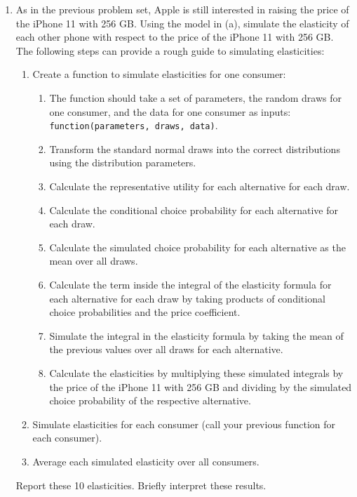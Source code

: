 \documentclass[11pt,letterpaper]{article}\usepackage[]{graphicx}\usepackage[]{color}
\begin{document}
\begin{enumerate}[label=\alph*., leftmargin=*]
	\item As in the previous problem set, Apple is still interested in raising the price of the iPhone 11 with 256 GB. Using the model in (a), simulate the elasticity of each other phone with respect to the price of the iPhone 11 with 256 GB. The following steps can provide a rough guide to simulating elasticities:
	\begin{enumerate}[label=\Roman*.]
		\item Create a function to simulate elasticities for one consumer:
		\begin{enumerate}[label=\roman*.]
			\item The function should take a set of parameters, the random draws for one consumer, and the data for one consumer as inputs: \texttt{function(parameters, draws, data)}.
			\item Transform the standard normal draws into the correct distributions using the distribution parameters.
			\item Calculate the representative utility for each alternative for each draw.
			\item Calculate the conditional choice probability for each alternative for each draw.
			\item Calculate the simulated choice probability for each alternative as the mean over all draws.
			\item Calculate the term inside the integral of the elasticity formula for each alternative for each draw by taking products of conditional choice probabilities and the price coefficient.
			\item Simulate the integral in the elasticity formula by taking the mean of the previous values over all draws for each alternative.
			\item Calculate the elasticities by multiplying these simulated integrals by the price of the iPhone 11 with 256 GB and dividing by the simulated choice probability of the respective alternative.
		\end{enumerate}
		\item Simulate elasticities for each consumer (call your previous function for each consumer).
		\item Average each simulated elasticity over all consumers.
	\end{enumerate}
	Report these 10 elasticities. Briefly interpret these results.


\end{enumerate}
\end{document}
